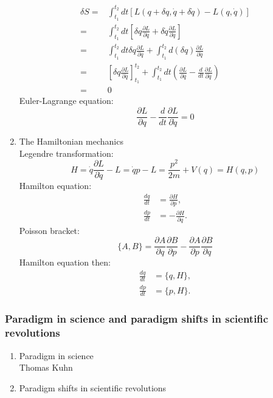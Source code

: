 \documentclass[12pt]{article}
\numberwithin{equation}{section}
\begin{document}
\begin{enumerate}
\begin{equation}
\begin{aligned}
	\delta S =& \int_{t_1}^{t_2}dt[L(q+\delta q, \dot{q}+\delta \dot{q})-L(q,\dot{q})] \\
	=&\int_{t_1}^{t_2}dt[\delta q \frac{\partial L}{\partial q}+\delta \dot{q} \frac{\partial L}{\partial \dot{q}}] \\
	=&\int_{t_1}^{t_2}dt\delta q \frac{\partial L}{\partial q}+\int_{t_1}^{t_2}d(\delta q) \frac{\partial L}{\partial \dot{q}} \\
	=&[\delta q \frac{\partial L}{\partial \dot{q}}]_{t_1}^{t_2}+\int_{t_1}^{t_2}dt(\frac{\partial L}{\partial q}-\frac{d}{dt}\frac{\partial L}{\partial \dot{q}}) \\
	=&0
	\end{aligned}\end{equation}
	Euler-Lagrange equation:
	\begin{equation}\frac{\partial L}{\partial q}-\frac{d}{dt}\frac{\partial L}{\partial \dot{q}}=0\end{equation}
\item The Hamiltonian mechanics \\
	Legendre transformation:
	\begin{equation}
	H=\dot{q}\frac{\partial L}{\partial \dot{q}}-L=\dot{q}p-L=\frac{p^2}{2m}+V(q)=H(q, p)
	\end{equation}
	Hamilton equation:
	\begin{equation}\begin{aligned}
	\frac{dq}{dt}&=\frac{\partial H}{\partial p},\\
	\frac{dp}{dt}&=-\frac{\partial H}{\partial q}.
	\end{aligned}\end{equation}
	Poisson bracket:
	\begin{equation}
	\{A, B\}=\frac{\partial A}{\partial q}\frac{\partial B}{\partial p} -\frac{\partial A}{\partial p}\frac{\partial B}{\partial q} 
	\end{equation}
	Hamilton equation then:
	\begin{equation}\begin{aligned}
	\frac{dq}{dt}&=\{q, H\},\\
	\frac{dp}{dt}&=\{p, H\}.
	\end{aligned}\end{equation}
\end{enumerate}
\subsubsection{Paradigm in science and paradigm shifts in scientific revolutions}
\begin{enumerate}
\item Paradigm in science\\
Thomas Kuhn
\item Paradigm shifts in scientific revolutions
\end{enumerate}
\end{document}
